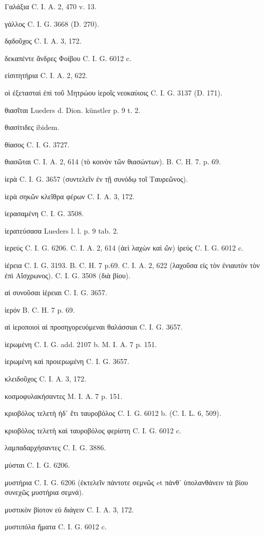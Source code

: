 \documentclass[a4paper, 11pt, oneside, polutonikogreek, german]{article}
\begin{document}
Γαλάξια C. I. A. 2, 470 v. 13.

γάλλος C. I. G. 3668 (D. 270).

δᾳδοῦχος C. I. A. 3, 172.

δεκαπέντε ἄνδρες Φοίβου C. I. G. 6012 c.

εἰσιτητήρια C. I. A. 2, 622.

οἱ ἐξετασταὶ ἐπὶ τοῦ Μητρώου ἱεροῖς νεοκαύιοις C. I. G. 3137 (D. 171).

θιασῖται Lueders d. Dion. künstler p. 9 t. 2.

θιασίτιδες ibidem.

θίασος C. I. G. 3727.

θιασῶται C. I. A. 2, 614 (τὸ κοινὸν τῶν θιασώντων). B. C. H. 7. p. 69.

ἱερὰ C. I. G. 3657 (συντελεῖν ἐν τῇ συνόδῳ τοῖ Ταυρεῶνος).

ἱερὰ σηκῶν κλεῖθρα φέρων C. I. A. 3, 172.

ἱερασαμένη C. I. G. 3508.

ἱερατεύσασα Lueders l. l. p. 9 tab. 2.

ἱερεύς C. I. G. 6206. C. I. A. 2, 614 (ἀεὶ λαχὼν καὶ ὤν) ἱρεύς C. I. G. 6012 c.

ἱέρεια C. I. G. 3193. B. C. H. 7 p.69. C. I. A. 2, 622 (λαχοῦσα εἰς τὸν ἐνιαυτὸν τὸν ἐπὶ Αἴσχρωνος). C. I. G. 3508 (διὰ βίου).

αἱ συνοῦσαι ἱέρειαι C. I. G. 3657.

ἱερόν B. C. H. 7 p. 69.

αἱ ἱεροποιοὶ αἱ προσηγορευόμεναι θαλάσσιαι C. I. G. 3657.

ἱερωμένη C. I. G. add. 2107 b. M. I. A. 7 p. 151.

ἱερωμένη καὶ προιερωμένη C. I. G. 3657.

κλειδοῦχος C. I. A. 3, 172.

κοσμοφυλακήσαντες M. I. A. 7 p. 151.

κριοβόλος τελετὴ ἠδ᾽ ἔτι ταυροβόλος C. I. G. 6012 b. (C. I. L. 6, 509).

κριοβόλος τελετὴ καὶ ταυροβόλος φερίστη C. I. G. 6012 c.

λαμπαδαρχήσαντες C. I. G. 3886.

μύσται C. I. G. 6206.

μυστήρια C. I. G. 6206 (ἐκτελεῖν πάντοτε σεμνῶς et πάνθ᾽ ὑπολανθάνειν τὰ βίου συνεχῶς μυστήρια σεμνά).

μυστικὸν βίοτον εὐ διάγειν C. I. A. 3, 172.

μυστιπόλα ἤματα C. I. G. 6012 c.
\end{document}
